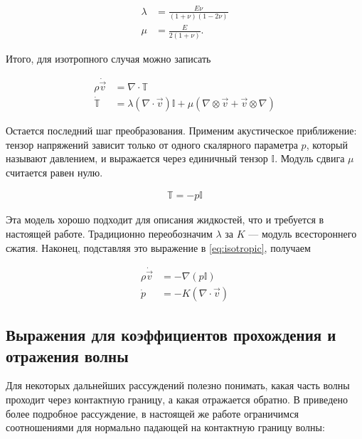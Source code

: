\begin{equation}
	\begin{aligned}
		\lambda & =\frac{E \nu}{(1+\nu)(1-2 \nu)} \\
		\mu & =\frac{E}{2(1+\nu)} .
	\end{aligned}
\end{equation}

Итого, для изотропного случая можно записать

\begin{equation}
	\label{eq:isotropic}
	\begin{aligned}
		\rho \dot{\vec{v}} & =\nabla \cdot \mathbb{T} \\
		\dot{\mathbb{T}} & =\lambda(\nabla \cdot \vec{v}) \mathbb{I}+\mu\left(\nabla \otimes \vec{v}+ \vec{v} \otimes \nabla\right)
	\end{aligned}
\end{equation}

Остается последний шаг преобразования. Применим акустическое приближение: тензор напряжений зависит только от одного скалярного параметра $p$, который называют давлением, и выражается через единичный тензор $\mathbb{I}$. Модуль сдвига $\mu$ считается равен нулю.

\begin{equation}
	\begin{aligned}
		\mathbb{T} = -p \mathbb{I}
	\end{aligned}
\end{equation}

Эта модель хорошо подходит для описания жидкостей, что и требуется в настоящей работе. Традиционно переобозначим $\lambda$ за $K$ --- модуль всестороннего сжатия. Наконец,  подставляя это выражение в \ref{eq:isotropic}, получаем

\begin{equation}
	\begin{aligned}
		\rho \dot{\vec{v}} & =-\nabla (p \mathbb{I}) \\
		\dot{p} & =-K(\nabla \cdot \vec{v})
	\end{aligned}
\end{equation}

\subsection{Выражения для коэффициентов прохождения и отражения волны}

Для некоторых дальнейших рассуждений полезно понимать, какая часть волны проходит через контактную границу, а какая отражается обратно. В \cite{kazakov} приведено более подробное рассуждение, в настоящей же работе ограничимся соотношениями для нормально падающей на контактную границу волны:

